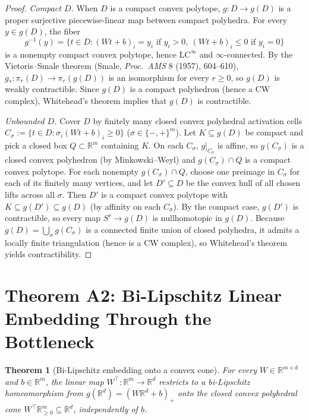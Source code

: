 \documentclass[11pt]{article}
\theoremstyle{plain}
\newtheorem{theorem}{Theorem}
\theoremstyle{definition}
\theoremstyle{remark}
\begin{document}
\begin{proof}
\emph{Compact $D$.} When $D$ is a compact convex polytope, $g : D \to g(D)$ is a proper surjective piecewise-linear map between compact polyhedra. For every $y \in g(D)$, the fiber
\[
g^{-1}(y) = \bigl\{t \in D : (Wt + b)_i = y_i \text{ if } y_i > 0,\ (Wt + b)_i \le 0 \text{ if } y_i = 0\bigr\}
\]
is a nonempty compact convex polytope, hence $\mathrm{LC}^\infty$ and $\infty$-connected. By the Vietoris--Smale theorem (Smale, \emph{Proc.\ AMS} 8 (1957), 604--610), $g_* : \pi_r(D) \to \pi_r(g(D))$ is an isomorphism for every $r \ge 0$, so $g(D)$ is weakly contractible. Since $g(D)$ is a compact polyhedron (hence a CW complex), Whitehead's theorem implies that $g(D)$ is contractible.

\emph{Unbounded $D$.} Cover $D$ by finitely many closed convex polyhedral activation cells $C_\sigma := \{t \in D : \sigma_i (Wt+b)_i \ge 0\}$ ($\sigma \in \{-,+\}^m$). Let $K \subseteq g(D)$ be compact and pick a closed box $Q \subset \mathbb{R}^m$ containing $K$. On each $C_\sigma$, $g|_{C_\sigma}$ is affine, so $g(C_\sigma)$ is a closed convex polyhedron (by Minkowski--Weyl) and $g(C_\sigma) \cap Q$ is a compact convex polytope. For each nonempty $g(C_\sigma) \cap Q$, choose one preimage in $C_\sigma$ for each of its finitely many vertices, and let $D' \subseteq D$ be the convex hull of all chosen lifts across all $\sigma$. Then $D'$ is a compact convex polytope with $K \subseteq g(D') \subseteq g(D)$ (by affinity on each $C_\sigma$). By the compact case, $g(D')$ is contractible, so every map $S^r \to g(D)$ is nullhomotopic in $g(D)$. Because $g(D) = \bigcup_\sigma g(C_\sigma)$ is a connected finite union of closed polyhedra, it admits a locally finite triangulation (hence is a CW complex), so Whitehead's theorem yields contractibility.
\end{proof}

\section{Theorem A2: Bi-Lipschitz Linear Embedding Through the Bottleneck}\label{sec:A2}

\begin{theorem}[Bi-Lipschitz embedding onto a convex cone]\label{thm:A2}
For every $W \in \mathbb{R}^{m \times d}$ and $b \in \mathbb{R}^m$, the linear map $W^\top : \mathbb{R}^m \to \mathbb{R}^d$ restricts to a bi-Lipschitz homeomorphism from $g(\mathbb{R}^d) = (W\mathbb{R}^d + b)_+$ onto the closed convex polyhedral cone $W^\top \mathbb{R}_{\ge 0}^m \subseteq \mathbb{R}^d$, independently of $b$.
\end{theorem}
\end{document}
